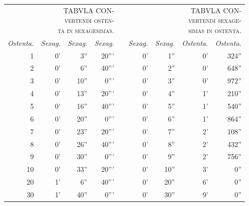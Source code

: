 \begin{wraptable}{r}{0mm}
\footnotesize
\setlength{\tabcolsep}{3pt}
\renewcommand{\arraystretch}{1.1}
\begin{tabular}{ |r @{}| r  r  r | c |r | r | r r | }
\multicolumn{4}{p{3cm}}{\parbox[t]{3cm}
 {\scshape\small TABVLA CON-\\
 \footnotesize vertendi osten-\\
 \upshape ta in sexagesimas.}}
& \multicolumn{1}{c}{} &
\multicolumn{4}{p{3cm}}{\parbox[t]{3cm}
 {\scshape\small TABVLA CON-\\
 \footnotesize vertendi sexage-\\
 \upshape simas in ostenta.}}
\\
\cline{1-4} \cline{6-9}
\itshape\scriptsize Ostenta. &
\itshape\scriptsize Sexag. &
\itshape\scriptsize Sexag. &
\itshape\scriptsize Sexag. &
\hspace{5mm} &
\itshape\scriptsize Sexag. &
\itshape\scriptsize Sexag. &
\itshape\scriptsize Ostenta. &
\itshape\scriptsize Ostenta.
\\
\cline{1-4} \cline{6-9}
   1 &  0' &  3'' & 20''' & &  0' &  1'' &    0' & 324'' \\
\cline{2-4} \cline{8-9}
   2 &  0' &  6'' & 40''' & &  0' &  2'' &    0' & 648'' \\
\cline{2-4} \cline{8-9}
   3 &  0' & 10'' &  0''' & &  0' &  3'' &    0' & 972'' \\
\cline{2-4} \cline{8-9}
   4 &  0' & 13'' & 20''' & &  0' &  4'' &    1' & 210'' \\
\cline{2-4} \cline{8-9}
   5 &  0' & 16'' & 40''' & &  0' &  5'' &    1' & 540'' \\
\cline{2-4} \cline{8-9}
   6 &  0' & 20'' &  0''' & &  0' &  6'' &    1' & 864'' \\
\cline{2-4} \cline{8-9}
   7 &  0' & 23'' & 20''' & &  0' &  7'' &    2' & 108'' \\
\cline{2-4} \cline{8-9}
   8 &  0' & 26'' & 40''' & &  0' &  8'' &    2' & 432'' \\
\cline{2-4} \cline{8-9}
   9 &  0' & 30'' &  0''' & &  0' &  9'' &    2' & 756'' \\
\cline{2-4} \cline{8-9}
  10 &  0' & 33'' & 20''' & &  0' & 10'' &    3' &   0'' \\
\cline{2-4} \cline{8-9}
  20 &  1' &  6'' & 40''' & &  0' & 20'' &    6' &   0'' \\
\cline{2-4} \cline{8-9}
  30 &  1' & 40'' &  0''' & &  0' & 30'' &    9' &   0'' \\
\cline{2-4} \cline{8-9}

\end{tabular}
\end{wraptable}
